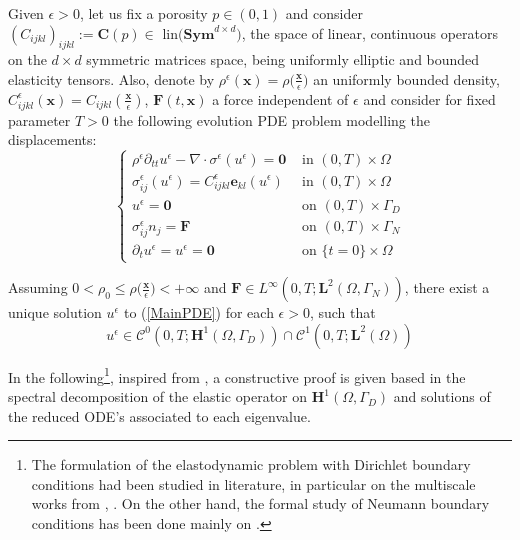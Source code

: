 Given $\epsilon > 0$, let us fix a porosity $p \in (0,1)$ and consider $(C_{ijkl})_{ijkl}:=\mathbf{C}(p) \in \text{ lin}\big(\textbf{Sym}^{d\times d})$, the space of linear, continuous operators on the $d\times d$ symmetric matrices space, being uniformly elliptic and bounded elasticity tensors. Also, denote by $\rho^{\epsilon}(\mathbf{x}) = \rho \big( \frac{\mathbf{x}}{\epsilon}\big)$ an uniformly bounded density, $C_{ijkl}^{\epsilon}(\mathbf{x}) = C_{ijkl}(\frac{\mathbf{x}}{\epsilon})$, $\mathbf{F}(t, \mathbf{x})$ a force independent of $\epsilon$ and consider for fixed parameter $T > 0$ the following evolution PDE problem modelling the displacements:
\begin{equation}
    \label{MainPDE}
    \left \{
    \begin{array}{cc}
        \rho^{\epsilon} \partial_{tt} u^{\epsilon} - \nabla\cdot \sigma^{\epsilon}(u^{\epsilon})= \mathbf{0} & \text{ in } (0,T) \times \Omega \\
        \sigma^{\epsilon}_{ij}(u^{\epsilon}) = C_{ijkl}^{\epsilon} \mathbf{e}_{kl}(u^{\epsilon}) & \text{ in } (0,T)\times \Omega \\
        u^{\epsilon} = \mathbf{0} & \text{ on } (0,T) \times \Gamma_D \\
        \sigma^{\epsilon}_{ij} n_j = \mathbf{F} & \text{ on } (0,T) \times \Gamma_N \\
        \partial_t u^{\epsilon} = u^{\epsilon} = \mathbf{0} & \text{ on } \{t=0\} \times \Omega
    \end{array}
    \right.
\end{equation}
\begin{prop}
Assuming $0 < \rho_0 \leq \rho\big( \frac{\mathbf{x}}{\epsilon} \big) < + \infty$ and $\mathbf{F} \in L^{\infty}(0,T;\mathbf{L}^2(\Omega,\Gamma_N))$, there exist a unique solution $u^{\epsilon}$ to (\ref{MainPDE}) for each $\epsilon > 0$, such that
\begin{equation*}
    u^{\epsilon} \in \mathcal{C}^0(0,T;\mathbf{H}^1(\Omega,\Gamma_D)) \cap \mathcal{C}^1(0,T;\mathbf{L}^2(\Omega))
\end{equation*}
\end{prop}

\begin{rem}
In the following\footnote{The formulation of the elastodynamic problem with Dirichlet boundary conditions had been studied in literature, in particular on the multiscale works from \cite{panasenko2005multi-scale}, \cite{bakhvalov1989homogenisation:}. On the other hand, the formal study of Neumann boundary conditions has been done mainly on \cite{oleinik1992mathematical}.}, inspired from \cite{raviart1983introduction}, a constructive proof is given based in the spectral decomposition of the elastic operator on $\mathbf{H}^1(\Omega, \Gamma_D)$ and solutions of the reduced ODE's associated to each eigenvalue. %
\end{rem}


